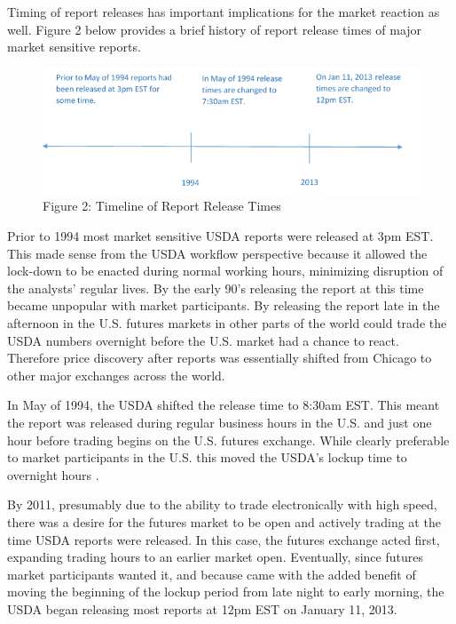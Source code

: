 \documentclass[]{book}
\theoremstyle{definition}
\theoremstyle{definition}
\theoremstyle{remark}
\begin{document}
Timing of report releases has important implications for the market
reaction as well. Figure 2 below provides a brief history of report
release times of major market sensitive reports.

\begin{figure}[htbp]
\centering
\includegraphics{images/NASS_release_timeline.png}
\caption{Figure 2: Timeline of Report Release Times}
\end{figure}

Prior to 1994 most market sensitive USDA reports were released at 3pm
EST. This made sense from the USDA workflow perspective because it
allowed the lock-down to be enacted during normal working hours,
minimizing disruption of the analysts' regular lives. By the early 90's
releasing the report at this time became unpopular with market
participants. By releasing the report late in the afternoon in the U.S.
futures markets in other parts of the world could trade the USDA numbers
overnight before the U.S. market had a chance to react. Therefore price
discovery after reports was essentially shifted from Chicago to other
major exchanges across the world.

In May of 1994, the USDA shifted the release time to 8:30am EST. This
meant the report was released during regular business hours in the U.S.
and just one hour before trading begins on the U.S. futures exchange.
While clearly preferable to market participants in the U.S. this moved
the USDA's lockup time to overnight hours \citep{history2007Nass}.

By 2011, presumably due to the ability to trade electronically with high
speed, there was a desire for the futures market to be open and actively
trading at the time USDA reports were released. In this case, the
futures exchange acted first, expanding trading hours to an earlier
market open. Eventually, since futures market participants wanted it,
and because came with the added benefit of moving the beginning of the
lockup period from late night to early morning, the USDA began releasing
most reports at 12pm EST on January 11, 2013.
\end{document}
